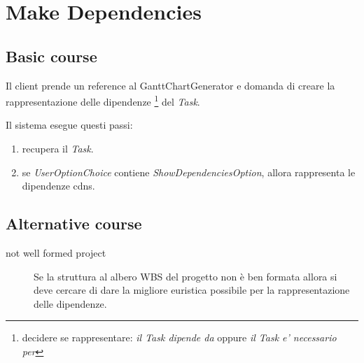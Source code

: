 \section{Make Dependencies}
\label{seq:makeDependencies}
\subsection{Basic course}
Il client prende un reference al GanttChartGenerator e domanda di creare la
rappresentazione delle dipendenze \footnote{decidere se rappresentare: \emph{il
Task dipende da} oppure \emph{il Task e' necessario per}} del \emph{Task}.

Il sistema esegue questi passi:
\begin{enumerate}
  \item recupera il \emph{Task}.
  \item se \emph{UserOptionChoice} contiene \emph{ShowDependenciesOption},
        allora rappresenta le dipendenze cdns. 
\end{enumerate}

\subsection{Alternative course}
\begin{description}
\item[not well formed project] Se la struttura al albero WBS del progetto non
\`e ben formata allora si deve cercare di dare la migliore euristica possibile
per la rappresentazione delle dipendenze.

\end{description}